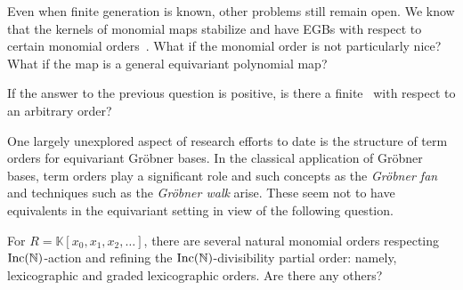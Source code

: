 Even when finite generation is known, other problems still remain open.  
 We know that the kernels of monomial maps stabilize \cite{aschenbrenner2007finite, KKL:equivariant-markov, draisma2013noetherianity} and have EGBs with respect to certain monomial orders~\cite{Krone:egb-toric}. What if the monomial order is not particularly nice? What if the map is a general equivariant polynomial map?

\begin{question}
If the answer to the previous question is positive, is there a finite \EGB\ with respect to an arbitrary order?
\end{question}

One largely unexplored aspect of research efforts to date is the structure of term orders for equivariant Gr\"obner bases.  In the classical application of Gr\"obner bases, term orders play a significant role and such concepts as the \emph{Gr\"obner fan} and techniques such as the \emph{Gr\"obner walk} arise. These seem not to have equivalents in the equivariant setting in view of the following question.  

\begin{question} For $R = \mathbb K[x_0,x_1,x_2,\ldots]$, there are several natural monomial orders respecting $\operatorname{Inc}(\mathbb N)$-action and refining the $\operatorname{Inc}(\mathbb N)$-divisibility partial order: namely, lexicographic and graded lexicographic orders.  Are there any others?
\end{question}



